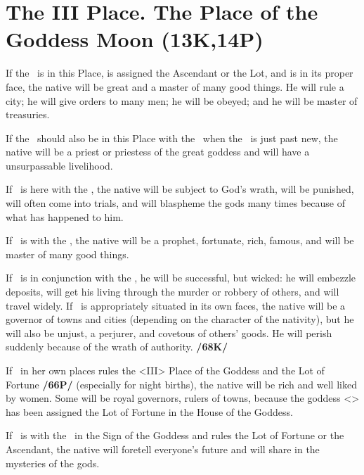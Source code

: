 \section{The III Place. The Place of the Goddess Moon (13K,14P)}
If the \Moon\, is in this Place, is assigned the Ascendant or the Lot, and is in its proper face, the native will be great and a master of many good things. He will rule a city; he will give orders to many men; he will be obeyed; and he will be master of treasuries. 

If the \Sun\, should also be in this Place with the \Moon\, when the \Moon\, is just past new, the native will be a priest or priestess of the great goddess and will have a unsurpassable livelihood. 

If \Saturn\, is here with the \Moon, the native will be subject to God's wrath, will be punished, will often come into trials, and will blaspheme the gods many times because of what has happened to him. 

If \Jupiter\, is with the \Moon, the native will be a prophet, fortunate, rich, famous, and will be master of many good things. 

If \Mars\, is in conjunction with the \Moon, he will be successful, but wicked: he will embezzle deposits, will get his living through the murder or robbery of others, and will travel widely. If \Mars\, is appropriately situated in its own faces, the native will be a governor of towns and cities (depending on the character of the nativity), but he will also be unjust, a perjurer, and covetous of others’ goods. He will perish suddenly because of the wrath of authority. \textbf{/68K/} 

If \Venus\, in her own places rules the <III> Place of the Goddess and the Lot of Fortune \textbf{/66P/} (especially for night births), the native will be rich and well liked by women. Some will be royal governors, rulers of towns, because the goddess <\Venus> has been assigned the Lot of Fortune in the House of the Goddess. 

If \Mercury\, is with the \Moon\, in the Sign of the Goddess and rules the Lot of Fortune or the Ascendant, the native will foretell everyone’s future and will share in the mysteries of the gods.

\newpage